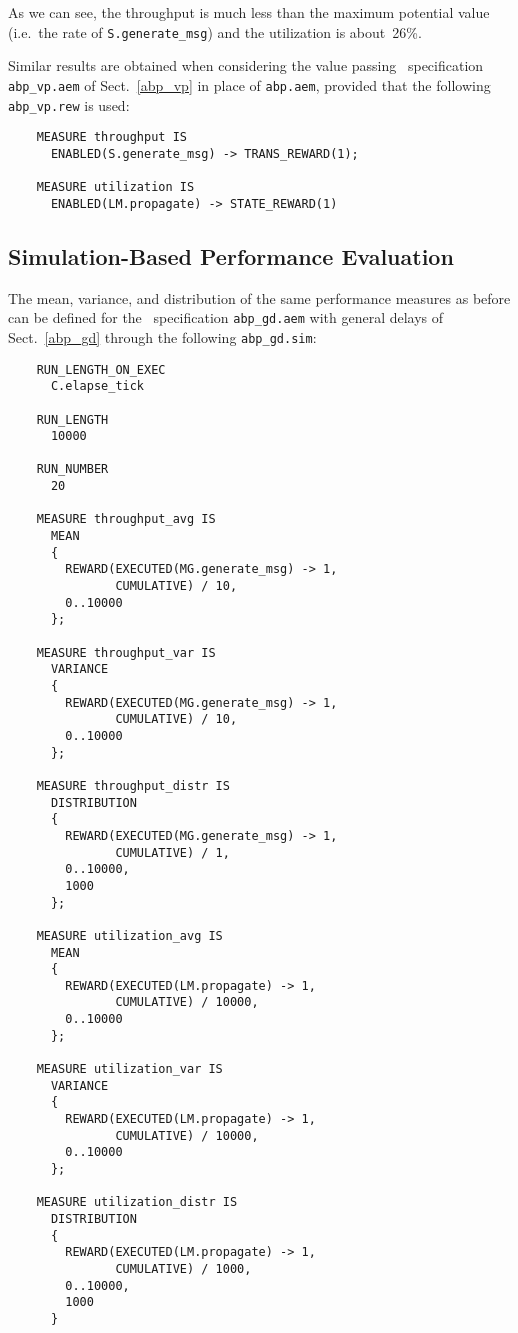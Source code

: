 \noindent As we can see, the throughput is much less than the maximum potential value (i.e.\ the rate of
{\tt S.generate\_msg}) and the utilization is about~26\%.

Similar results are obtained when considering the value passing \aemilia\ specification {\tt abp\_vp.aem}
of Sect.~\ref{abp_vp} in place of {\tt abp.aem}, provided that the following {\tt abp\_vp.rew} is used:

        \begin{verbatim}
    MEASURE throughput IS
      ENABLED(S.generate_msg) -> TRANS_REWARD(1);

    MEASURE utilization IS
      ENABLED(LM.propagate) -> STATE_REWARD(1)
        \end{verbatim}


\subsection{Simulation-Based Performance Evaluation}

The mean, variance, and distribution of the same performance measures as before can be defined for the
\aemilia\ specification {\tt abp\_gd.aem} with general delays of Sect.~\ref{abp_gd} through the following
{\tt abp\_gd.sim}:

        \begin{verbatim}
    RUN_LENGTH_ON_EXEC
      C.elapse_tick

    RUN_LENGTH
      10000

    RUN_NUMBER
      20

    MEASURE throughput_avg IS
      MEAN
      {
        REWARD(EXECUTED(MG.generate_msg) -> 1,
               CUMULATIVE) / 10,
        0..10000
      };

    MEASURE throughput_var IS
      VARIANCE
      {
        REWARD(EXECUTED(MG.generate_msg) -> 1,
               CUMULATIVE) / 10,
        0..10000
      };

    MEASURE throughput_distr IS
      DISTRIBUTION
      {
        REWARD(EXECUTED(MG.generate_msg) -> 1,
               CUMULATIVE) / 1,
        0..10000,
        1000
      };

    MEASURE utilization_avg IS
      MEAN
      {
        REWARD(EXECUTED(LM.propagate) -> 1,
               CUMULATIVE) / 10000,
        0..10000
      };

    MEASURE utilization_var IS
      VARIANCE
      {
        REWARD(EXECUTED(LM.propagate) -> 1,
               CUMULATIVE) / 10000,
        0..10000
      };

    MEASURE utilization_distr IS
      DISTRIBUTION
      {
        REWARD(EXECUTED(LM.propagate) -> 1,
               CUMULATIVE) / 1000,
        0..10000,
        1000
      }
        \end{verbatim}

